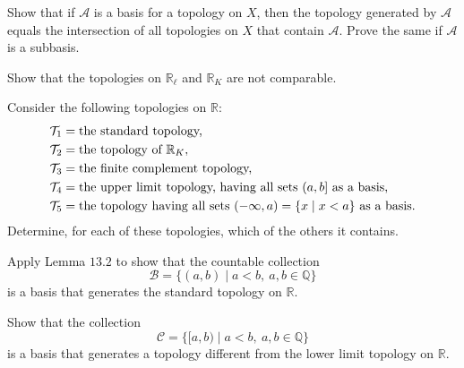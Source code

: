 \begin{exercise}
  Show that if \(\mathcal{A}\) is a basis for a topology on \(X\), then the
  topology generated by \(\mathcal{A}\) equals the intersection of all
  topologies on \(X\) that contain \(\mathcal{A}\).
  Prove the same if \(\mathcal{A}\) is a subbasis.
\item
  Show that the topologies on \(\mathbb{R}_{\ell}\) and \(\mathbb{R}_K\) are
  not comparable.
\item
  Consider the following topologies on \(\mathbb{R}\):
  \begin{align*}
    \mathcal{T}_1 & = \text{the standard topology,}\\
    \mathcal{T}_2 & = \text{the topology of } \mathbb{R}_K,\\
    \mathcal{T}_3 & = \text{the finite complement topology,}\\
    \mathcal{T}_4 & = \text{the upper limit topology, having all sets } (a, b]
             \text{ as a basis,}\\
    \mathcal{T}_5 & = \text{the topology having all sets }
             (-\infty, a) = \{x\mid x < a\} \text{ as a basis.}
  \end{align*}
  Determine, for each of these topologies, which of the others it contains.
\item
  \begin{exercise}[label = (\alph*)]
  \item
    Apply Lemma \(13.2\) to show that the countable collection
    \[
    \mathcal{B} = \{(a, b)\mid a < b, \ a,b\in\mathbb{Q}\}
    \]
    is a basis that generates the standard topology on \(\mathbb{R}\).
  \item
    Show that the collection
    \[
    \mathcal{C} = \{[a, b)\mid a < b, \ a,b\in\mathbb{Q}\}
    \]
    is a basis that generates a topology different from the lower limit
    topology on \(\mathbb{R}\).
  \end{exercise}
\end{exercise}

